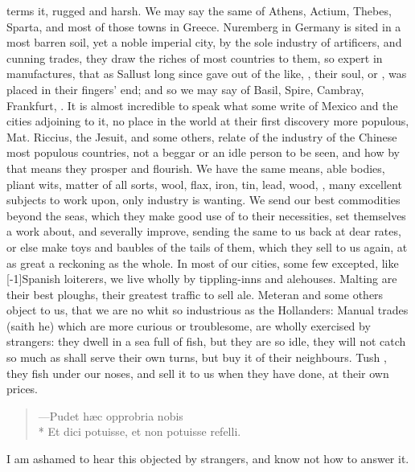 {terms it, rugged and harsh. We may say the same of Athens, Actium,
Thebes, Sparta, and most of those towns in Greece. Nuremberg in Germany
is sited in a most barren soil, yet a noble imperial city, by the sole
industry of artificers, and cunning trades, they draw the riches of
most countries to them, so expert in manufactures, that as Sallust long
since gave out of the like, ,
their soul, or , was placed in their fingers' end; and
so we may say of Basil, Spire, Cambray, Frankfurt, \etc{}. It is almost
incredible to speak what some write of Mexico and the cities adjoining
to it, no place in the world at their first discovery more populous,
Mat. Riccius, the Jesuit, and some others, relate of the industry
of the Chinese most populous countries, not a beggar or an idle person
to be seen, and how by that means they prosper and flourish. We have
the same means, able bodies, pliant wits, matter of all sorts, wool,
flax, iron, tin, lead, wood, \etc{}, many excellent subjects to work upon,
only industry is wanting. We send our best commodities beyond the seas,
which they make good use of to their necessities, set themselves a work
about, and severally improve, sending the same to us back at dear
rates, or else make toys and baubles of the tails of them, which they
sell to us again, at as great a reckoning as the whole. In most of our
cities, some few excepted, like [-1\baselineskip]Spanish loiterers, we live wholly
by tippling-inns and alehouses. Malting are their best ploughs, their
greatest traffic to sell ale. Meteran and some others object to
us, that we are no whit so industrious as the Hollanders: Manual trades
(saith he) which are more curious or troublesome, are wholly exercised
by strangers: they dwell in a sea full of fish, but they are so idle,
they will not catch so much as shall serve their own turns, but buy it
of their neighbours. Tush , they fish under our noses,
and sell it to us when they have done, at their own prices.

\begin{verse}
---\textlatin{Pudet h\ae{}c opprobria nobis}\\*
\textlatin{Et dici potuisse, et non potuisse refelli.}
\end{verse}

I am ashamed to hear this objected by strangers, and know not how to
answer it.

}
